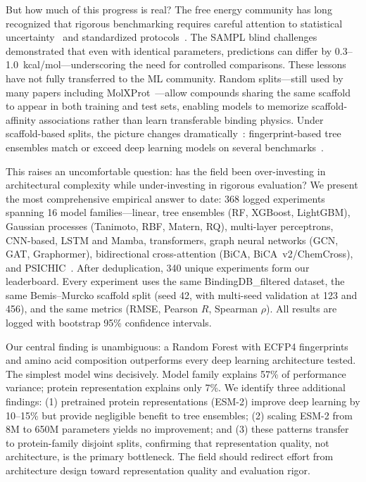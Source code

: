 \documentclass[pmlr,twocolumn]{jmlr}
\begin{document}
But how much of this progress is real? The free energy community has long recognized that rigorous benchmarking requires careful attention to statistical uncertainty~\citep{shirts2008mbar,paliwal2011benchmark} and standardized protocols~\citep{mey2024benchmark}. The SAMPL blind challenges~\citep{rizzi2020sampl6} demonstrated that even with identical parameters, predictions can differ by 0.3--1.0~kcal/mol---underscoring the need for controlled comparisons. These lessons have not fully transferred to the ML community. Random splits---still used by many papers including MolXProt~\citep{cucco2026molxprot}---allow compounds sharing the same scaffold to appear in both training and test sets, enabling models to memorize scaffold-affinity associations rather than learn transferable binding physics. Under scaffold-based splits, the picture changes dramatically~\citep{balm2024,landrum2024ic50}: fingerprint-based tree ensembles match or exceed deep learning models on several benchmarks~\citep{balm2024,gorantla2023proteins,gorantla2024benchmarking}.

This raises an uncomfortable question: has the field been over-investing in architectural complexity while under-investing in rigorous evaluation? We present the most comprehensive empirical answer to date: 368 logged experiments spanning 16 model families---linear, tree ensembles (RF, XGBoost, LightGBM), Gaussian processes (Tanimoto, RBF, Matern, RQ), multi-layer perceptrons, CNN-based, LSTM and Mamba, transformers, graph neural networks (GCN, GAT, Graphormer), bidirectional cross-attention (BiCA, BiCA~v2/ChemCross), and PSICHIC~\citep{hao2024psichic}. After deduplication, 340 unique experiments form our leaderboard. Every experiment uses the same BindingDB\_filtered dataset, the same Bemis--Murcko scaffold split (seed 42, with multi-seed validation at 123 and 456), and the same metrics (RMSE, Pearson $R$, Spearman $\rho$). All results are logged with bootstrap 95\% confidence intervals.

Our central finding is unambiguous: a Random Forest with ECFP4 fingerprints and amino acid composition outperforms every deep learning architecture tested. The simplest model wins decisively. Model family explains 57\% of performance variance; protein representation explains only 7\%. We identify three additional findings: (1) pretrained protein representations (ESM-2) improve deep learning by 10--15\% but provide negligible benefit to tree ensembles; (2) scaling ESM-2 from 8M to 650M parameters yields no improvement; and (3) these patterns transfer to protein-family disjoint splits, confirming that representation quality, not architecture, is the primary bottleneck. The field should redirect effort from architecture design toward representation quality and evaluation rigor.
\end{document}
